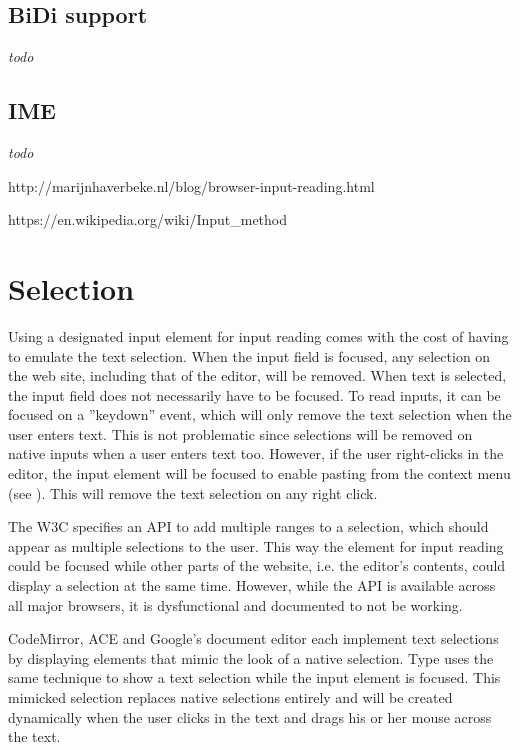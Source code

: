\subsection{BiDi support}

\textit{todo}

\subsection{IME} 

\textit{todo}

http://marijnhaverbeke.nl/blog/browser-input-reading.html 

https://en.wikipedia.org/wiki/Input\_method

\section{Selection}

Using a designated input element for input reading comes with the cost of having to emulate the text selection. When the input field is focused, any selection on the web site, including that of the editor, will be removed. When text is selected, the input field does not necessarily have to be focused. To read inputs, it can be focused on a ''keydown'' event, which will only remove the text selection when the user enters text. This is not problematic since selections will be removed on native inputs when a user enters text too. However, if the user right-clicks in the editor, the input element will be focused to enable pasting from the context menu (see ). This will remove the text selection on any right click.

The W3C specifies an API to add multiple ranges to a selection, which should appear as multiple selections to the user. This way the element for input reading could be focused while other parts of the website, i.e. the editor's contents, could display a selection at the same time. However, while the API is available across all major browsers, it is dysfunctional and documented to not be working.

CodeMirror, ACE and Google's document editor each implement text selections by displaying  elements that mimic the look of a native selection. Type uses the same technique to show a text selection while the input element is focused. This mimicked selection replaces native selections entirely and will be created dynamically when the user clicks in the text and drags his or her mouse across the text.


